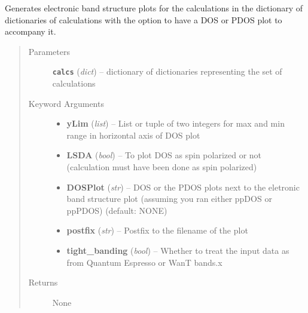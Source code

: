 \documentclass[letterpaper,10pt,english]{sphinxmanual}
\begin{document}

\begin{fulllineitems}
\label{plot:plot.bands}
Generates electronic band structure plots for the calculations in the dictionary of dictionaries
of calculations with the option to have a DOS or PDOS plot to accompany it.
\begin{quote}\begin{description}
\item[{Parameters}] \leavevmode
\textbf{\texttt{calcs}} (\emph{dict}) -- dictionary of dictionaries representing the set of calculations

\item[{Keyword Arguments}] \leavevmode\begin{itemize}
\item {} 
\textbf{yLim} (\emph{list}) --
List or tuple of two integers for max and min range in horizontal axis of DOS plot

\item {} 
\textbf{LSDA} (\emph{bool}) --
To plot DOS as spin polarized or not (calculation must have been done as spin polarized)

\item {} 
\textbf{DOSPlot} (\emph{str}) --
DOS or the PDOS plots next to the eletronic band structure plot (assuming you ran
either ppDOS or ppPDOS) (default: NONE)

\item {} 
\textbf{postfix} (\emph{str}) --
Postfix to the filename of the plot

\item {} 
\textbf{tight\_banding} (\emph{bool}) --
Whether to treat the input data as from Quantum Espresso or WanT bands.x

\end{itemize}

\item[{Returns}] \leavevmode
None

\end{description}\end{quote}

\end{fulllineitems}


\begin{fulllineitems}
\label{plot:plot.distortionEnergy}
\end{fulllineitems}
\end{document}
